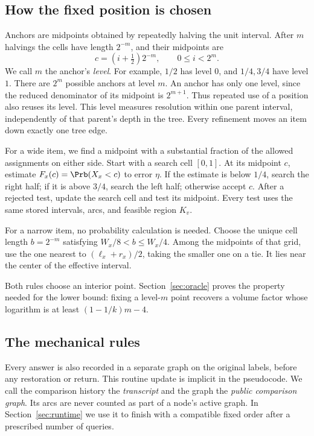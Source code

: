 \subsection{How the fixed position is chosen}

Anchors are midpoints obtained by repeatedly halving the unit interval.
After $m$ halvings the cells have length $2^{-m}$, and their midpoints are
\begin{equation}\label{eq:dyadic}
c=(i+\tfrac12)2^{-m},\qquad 0\le i<2^m.
\end{equation}
We call $m$ the anchor's \emph{level}. For example, $1/2$ has level $0$,
and $1/4,3/4$ have level $1$. There are $2^m$ possible anchors at level $m$.
An anchor has only one level, since the reduced denominator of its midpoint
is $2^{m+1}$. Thus repeated use of a position also reuses its level. This level measures
resolution within one parent interval, independently of that parent's depth
in the tree. Every refinement moves an item down exactly one tree edge.

For a wide item, we find a midpoint with a substantial fraction of the
allowed assignments on either side. Start with a search cell $[0,1]$.
At its midpoint $c$, estimate $F_x(c)=\Prb(X_x<c)$ to error $\eta$.
If the estimate is below $1/4$, search the right half; if it is above $3/4$,
search the left half; otherwise accept $c$. After a rejected test, update the search cell and test its midpoint.
Every test uses the same stored intervals, arcs, and feasible region $K_v$.

For a narrow item, no probability calculation is needed. Choose the unique
cell length $b=2^{-m}$ satisfying $W_x/8<b\le W_x/4$. Among the midpoints
of that grid, use the one nearest to $(\ell_x+r_x)/2$, taking the smaller
one on a tie. It lies near the center of the effective interval.

Both rules choose an interior point. Section~\ref{sec:oracle} proves the
property needed for the lower bound: fixing a level-$m$ point recovers a
volume factor whose logarithm is at least $(1-1/k)m-4$.

\subsection{The mechanical rules}

Every answer is also recorded in a separate graph on the original labels,
before any restoration or return.
This routine update is implicit in the pseudocode. We call the comparison
history the \emph{transcript} and the graph the \emph{public comparison graph}.
Its arcs are never counted as part of a node's active graph.
In Section~\ref{sec:runtime} we use it to
finish with a compatible fixed order after a prescribed number of queries.

